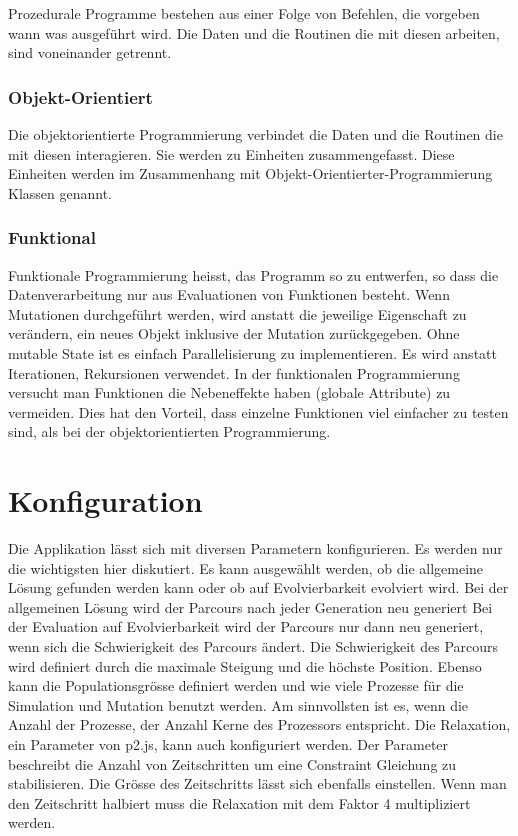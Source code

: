         Prozedurale Programme bestehen aus einer Folge von Befehlen,
        die vorgeben wann was ausgeführt wird.
        Die Daten und die Routinen die mit diesen arbeiten, sind voneinander getrennt.

      \subsubsection{Objekt-Orientiert\label{subsub:TechnologyParadigmaObjectOriented}}

        Die objektorientierte Programmierung verbindet die Daten und
        die Routinen die mit diesen interagieren. Sie werden zu Einheiten zusammengefasst.
        Diese Einheiten werden im Zusammenhang mit Objekt-Orientierter-Programmierung Klassen genannt.

      \subsubsection{Funktional\label{subsub:TechnologyParadigmaFunctional}}

        Funktionale Programmierung heisst, das Programm so zu entwerfen, so dass die Datenverarbeitung nur aus Evaluationen von Funktionen besteht.
        Wenn Mutationen durchgeführt werden, wird anstatt die jeweilige Eigenschaft zu verändern,
        ein neues Objekt inklusive der Mutation zurückgegeben. Ohne mutable State ist es einfach Parallelisierung zu implementieren.
        Es wird anstatt Iterationen, Rekursionen verwendet.
        In der funktionalen Programmierung versucht man Funktionen die Nebeneffekte haben (globale Attribute) zu vermeiden.
        Dies hat den Vorteil, dass einzelne Funktionen viel einfacher zu testen sind, als bei der objektorientierten Programmierung.

  \section{Konfiguration\label{sec:Konfiguration}}

    Die Applikation lässt sich mit diversen Parametern konfigurieren.
    Es werden nur die wichtigsten hier diskutiert.
    Es kann ausgewählt werden, ob die allgemeine Lösung gefunden werden kann oder
    ob auf Evolvierbarkeit evolviert wird. Bei der allgemeinen Lösung wird der Parcours
    nach jeder Generation neu generiert Bei der Evaluation auf Evolvierbarkeit
    wird der Parcours nur dann neu generiert, wenn sich die Schwierigkeit des Parcours ändert.
    Die Schwierigkeit des Parcours wird definiert durch die maximale Steigung und die höchste Position.
    Ebenso kann die Populationsgrösse definiert werden und wie viele Prozesse für die Simulation und Mutation benutzt werden.
    Am sinnvollsten ist es, wenn die Anzahl der Prozesse, der Anzahl Kerne des Prozessors entspricht.
    Die Relaxation, ein Parameter von p2.js, kann auch konfiguriert werden.
    Der Parameter beschreibt die Anzahl von Zeitschritten um eine Constraint Gleichung zu stabilisieren.
    Die Grösse des Zeitschritts lässt sich ebenfalls einstellen.
    Wenn man den Zeitschritt halbiert muss die Relaxation mit dem
    Faktor 4 multipliziert werden.

